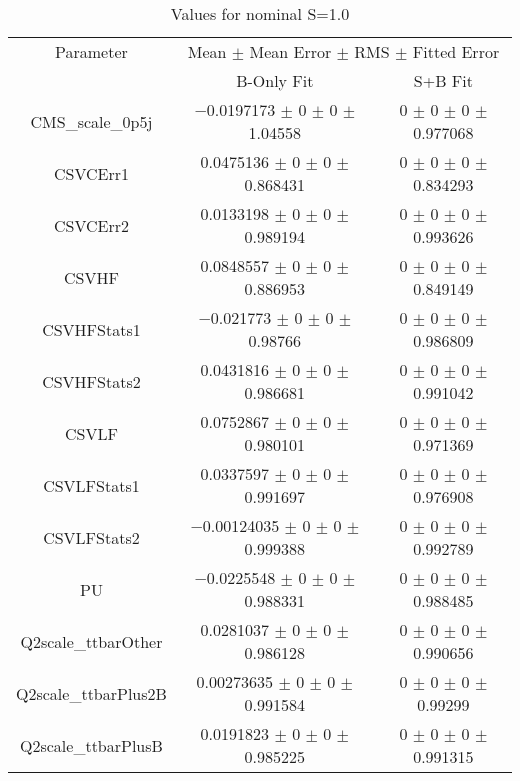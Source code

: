 \begin{table}
\centering
\caption{Values for nominal S=1.0}
\begin{tabular}{ccc}
\toprule
Parameter & \multicolumn{2}{c}{Mean $\pm$ Mean Error $\pm$ RMS $\pm$ Fitted Error}\\
 & B-Only Fit & S+B Fit\\
\midrule
CMS\_scale\_0p5j & \num{-0.0197173} $\pm$ \num{0} $\pm$ \num{0} $\pm$ \num{1.04558} & \num{0} $\pm$ \num{0} $\pm$ \num{0} $\pm$ \num{0.977068}\\
CSVCErr1 & \num{0.0475136} $\pm$ \num{0} $\pm$ \num{0} $\pm$ \num{0.868431} & \num{0} $\pm$ \num{0} $\pm$ \num{0} $\pm$ \num{0.834293}\\
CSVCErr2 & \num{0.0133198} $\pm$ \num{0} $\pm$ \num{0} $\pm$ \num{0.989194} & \num{0} $\pm$ \num{0} $\pm$ \num{0} $\pm$ \num{0.993626}\\
CSVHF & \num{0.0848557} $\pm$ \num{0} $\pm$ \num{0} $\pm$ \num{0.886953} & \num{0} $\pm$ \num{0} $\pm$ \num{0} $\pm$ \num{0.849149}\\
CSVHFStats1 & \num{-0.021773} $\pm$ \num{0} $\pm$ \num{0} $\pm$ \num{0.98766} & \num{0} $\pm$ \num{0} $\pm$ \num{0} $\pm$ \num{0.986809}\\
CSVHFStats2 & \num{0.0431816} $\pm$ \num{0} $\pm$ \num{0} $\pm$ \num{0.986681} & \num{0} $\pm$ \num{0} $\pm$ \num{0} $\pm$ \num{0.991042}\\
CSVLF & \num{0.0752867} $\pm$ \num{0} $\pm$ \num{0} $\pm$ \num{0.980101} & \num{0} $\pm$ \num{0} $\pm$ \num{0} $\pm$ \num{0.971369}\\
CSVLFStats1 & \num{0.0337597} $\pm$ \num{0} $\pm$ \num{0} $\pm$ \num{0.991697} & \num{0} $\pm$ \num{0} $\pm$ \num{0} $\pm$ \num{0.976908}\\
CSVLFStats2 & \num{-0.00124035} $\pm$ \num{0} $\pm$ \num{0} $\pm$ \num{0.999388} & \num{0} $\pm$ \num{0} $\pm$ \num{0} $\pm$ \num{0.992789}\\
PU & \num{-0.0225548} $\pm$ \num{0} $\pm$ \num{0} $\pm$ \num{0.988331} & \num{0} $\pm$ \num{0} $\pm$ \num{0} $\pm$ \num{0.988485}\\
Q2scale\_ttbarOther & \num{0.0281037} $\pm$ \num{0} $\pm$ \num{0} $\pm$ \num{0.986128} & \num{0} $\pm$ \num{0} $\pm$ \num{0} $\pm$ \num{0.990656}\\
Q2scale\_ttbarPlus2B & \num{0.00273635} $\pm$ \num{0} $\pm$ \num{0} $\pm$ \num{0.991584} & \num{0} $\pm$ \num{0} $\pm$ \num{0} $\pm$ \num{0.99299}\\
Q2scale\_ttbarPlusB & \num{0.0191823} $\pm$ \num{0} $\pm$ \num{0} $\pm$ \num{0.985225} & \num{0} $\pm$ \num{0} $\pm$ \num{0} $\pm$ \num{0.991315}\\

\end{tabular}
\end{table}
